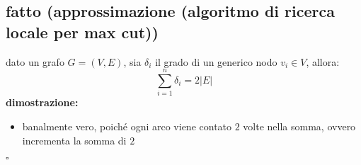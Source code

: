 
\subsection*{fatto (approssimazione (algoritmo di ricerca locale per max cut))}
\begin{flushleft}
	dato un grafo $G=(V,E)$, sia $\delta_i$ il grado di un generico nodo $v_i\in V$, allora:
	$$\sum_{i=1}^n\delta_i=2\vert E\vert$$
	\vspace{0.5cm}
	\textbf{dimostrazione:}
	\begin{itemize}
		\item banalmente vero, poich\'e ogni arco viene contato $2$ volte nella somma, ovvero
			incrementa la somma di $2$
	\end{itemize}
	\hfill$\square$
\end{flushleft}



